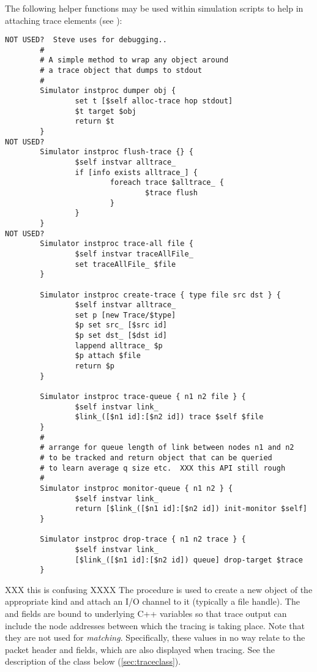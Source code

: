 \subsubsection{}
The following helper functions may be used within simulation
scripts to help in attaching trace elements (see ):
\begin{small}
\begin{verbatim}
NOT USED?  Steve uses for debugging..
        #
        # A simple method to wrap any object around
        # a trace object that dumps to stdout
        #
        Simulator instproc dumper obj {
                set t [$self alloc-trace hop stdout]
                $t target $obj
                return $t
        }
NOT USED?
        Simulator instproc flush-trace {} {
                $self instvar alltrace_
                if [info exists alltrace_] {
                        foreach trace $alltrace_ {
                                $trace flush
                        }
                }
        }
NOT USED?
        Simulator instproc trace-all file {
                $self instvar traceAllFile_
                set traceAllFile_ $file
        }

        Simulator instproc create-trace { type file src dst } {
                $self instvar alltrace_
                set p [new Trace/$type]
                $p set src_ [$src id]
                $p set dst_ [$dst id]
                lappend alltrace_ $p
                $p attach $file
                return $p
        }

        Simulator instproc trace-queue { n1 n2 file } {
                $self instvar link_
                $link_([$n1 id]:[$n2 id]) trace $self $file
        }
        #
        # arrange for queue length of link between nodes n1 and n2
        # to be tracked and return object that can be queried
        # to learn average q size etc.  XXX this API still rough
        #
        Simulator instproc monitor-queue { n1 n2 } {
                $self instvar link_
                return [$link_([$n1 id]:[$n2 id]) init-monitor $self]
        }

        Simulator instproc drop-trace { n1 n2 trace } {
                $self instvar link_
                [$link_([$n1 id]:[$n2 id]) queue] drop-target $trace
        }
\end{verbatim}
\end{small}
XXX this is confusing XXXX
The  procedure is used to create a new 
object of the appropriate kind and attach an I/O channel to it
(typically a file handle).
The  and  fields are bound to underlying C++
variables so that trace output can include the node addresses between
which the tracing is taking place.
Note that they are not used for {\em matching}.  Specifically, these
values in no way relate to the packet header  and 
fields, which are also displayed when tracing.
See the description of the 
class below (\ref{sec:traceclass}).

